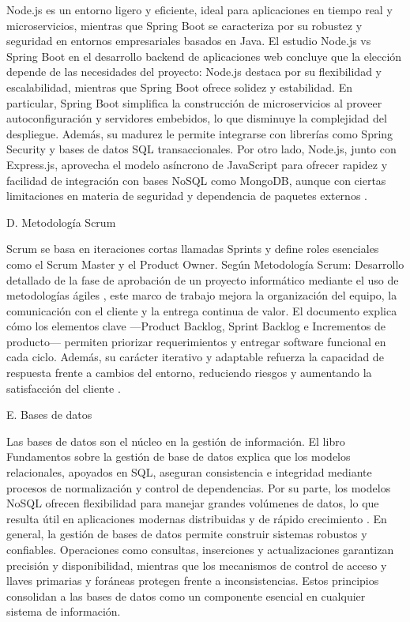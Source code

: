 Node.js es un entorno ligero y eficiente, ideal para aplicaciones en tiempo real y microservicios, mientras que Spring Boot se caracteriza por su robustez y seguridad en entornos empresariales basados en Java. El estudio Node.js vs Spring Boot en el desarrollo backend de aplicaciones web \cite{nodejs_springboot} concluye que la elección depende de las necesidades del proyecto: Node.js destaca por su flexibilidad y escalabilidad, mientras que Spring Boot ofrece solidez y estabilidad. En particular, Spring Boot simplifica la construcción de microservicios al proveer autoconfiguración y servidores embebidos, lo que disminuye la complejidad del despliegue. Además, su madurez le permite integrarse con librerías como Spring Security y bases de datos SQL transaccionales. Por otro lado, Node.js, junto con Express.js, aprovecha el modelo asíncrono de JavaScript para ofrecer rapidez y facilidad de integración con bases NoSQL como MongoDB, aunque con ciertas limitaciones en materia de seguridad y dependencia de paquetes externos \cite{nodejs_springboot}.

D. Metodología Scrum

Scrum se basa en iteraciones cortas llamadas Sprints y define roles esenciales como el Scrum Master y el Product Owner. Según Metodología Scrum: Desarrollo detallado de la fase de aprobación de un proyecto informático mediante el uso de metodologías ágiles \cite{scrum}, este marco de trabajo mejora la organización del equipo, la comunicación con el cliente y la entrega continua de valor. El documento explica cómo los elementos clave —Product Backlog, Sprint Backlog e Incrementos de producto— permiten priorizar requerimientos y entregar software funcional en cada ciclo. Además, su carácter iterativo y adaptable refuerza la capacidad de respuesta frente a cambios del entorno, reduciendo riesgos y aumentando la satisfacción del cliente \cite{scrum}.

E. Bases de datos

Las bases de datos son el núcleo en la gestión de información. El libro Fundamentos sobre la gestión de base de datos \cite{databases} explica que los modelos relacionales, apoyados en SQL, aseguran consistencia e integridad mediante procesos de normalización y control de dependencias. Por su parte, los modelos NoSQL ofrecen flexibilidad para manejar grandes volúmenes de datos, lo que resulta útil en aplicaciones modernas distribuidas y de rápido crecimiento \cite{databases}. En general, la gestión de bases de datos permite construir sistemas robustos y confiables. Operaciones como consultas, inserciones y actualizaciones garantizan precisión y disponibilidad, mientras que los mecanismos de control de acceso y llaves primarias y foráneas protegen frente a inconsistencias. Estos principios consolidan a las bases de datos como un componente esencial en cualquier sistema de información.
